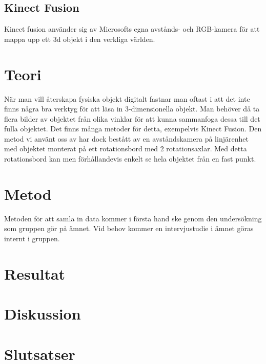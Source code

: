\subsection{Kinect Fusion}

Kinect fusion använder sig av Microsofts egna avstånds- och RGB-kamera för att mappa upp ett 3d objekt i den verkliga världen. 

\section{Teori}
\label{sec:theory-karlsson}

När man vill återskapa fysiska objekt digitalt fastnar man oftast i att det inte finns några bra verktyg för att läsa in 3-dimensionella objekt. Man behöver då ta flera bilder av objektet från olika vinklar för att kunna sammanfoga dessa till det fulla objektet. Det finns många metoder för detta, exempelvis Kinect Fusion. Den metod vi använt oss av har dock bestått av en avståndskamera på linjärenhet med objektet monterat på ett rotationsbord med 2 rotationsaxlar. Med detta rotationsbord kan men förhållandevis enkelt se hela objektet från en fast punkt.

\section{Metod}
\label{sec:method-karlsson}


Metoden för att samla in data kommer i första hand ske genom den undersökning som gruppen gör på ämnet. Vid behov kommer en intervjustudie i ämnet göras internt i gruppen. 


\section{Resultat}
\label{sec:results-karlsson}


\section{Diskussion}
\label{sec:discussion-karlsson}


\section{Slutsatser}
\label{sec:conclusions-karlsson}


